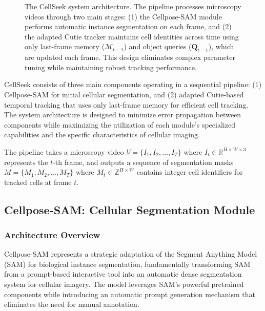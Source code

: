 \documentclass[12pt]{article}
\begin{document}
\begin{figure}[h!]
  \caption{The CellSeek system architecture. The pipeline processes microscopy videos through two main stages: (1) the Cellpose-SAM module performs automatic instance segmentation on each frame, and (2) the adapted Cutie tracker maintains cell identities across time using only last-frame memory ($\mathcal{M}_{t-1}$) and object queries ($\mathbf{Q}_{t-1}$), which are updated each frame. This design eliminates complex parameter tuning while maintaining robust tracking performance.}
  \label{fig:architecture}
\end{figure}

CellSeek consists of three main components operating in a sequential pipeline: (1) Cellpose-SAM for initial cellular segmentation, and (2) adapted Cutie-based temporal tracking that uses only last-frame memory for efficient cell tracking. The system architecture is designed to minimize error propagation between components while maximizing the utilization of each module's specialized capabilities and the specific characteristics of cellular imaging.

The pipeline takes a microscopy video $V = \{I_1, I_2, \ldots, I_T\}$ where $I_t \in \mathbb{R}^{H \times W \times 3}$ represents the $t$-th frame, and outputs a sequence of segmentation masks $M = \{M_1, M_2, \ldots, M_T\}$ where $M_t \in \mathbb{Z}^{H \times W}$ contains integer cell identifiers for tracked cells at frame $t$.

\subsection{Cellpose-SAM: Cellular Segmentation Module}

\subsubsection{Architecture Overview}

Cellpose-SAM represents a strategic adaptation of the Segment Anything Model (SAM) for biological instance segmentation, fundamentally transforming SAM from a prompt-based interactive tool into an automatic dense segmentation system for cellular imagery. The model leverages SAM's powerful pretrained components while introducing an automatic prompt generation mechanism that eliminates the need for manual annotation.
\end{document}
